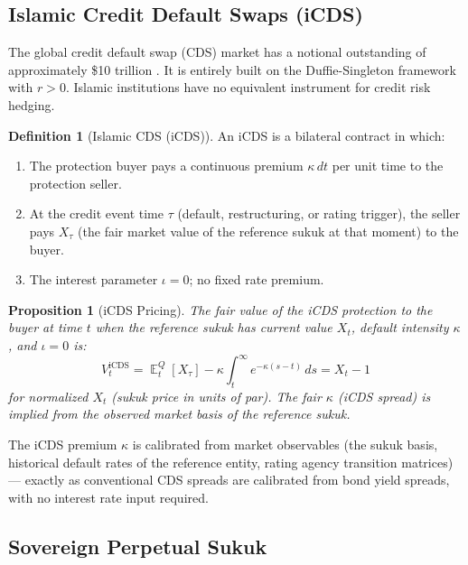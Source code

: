 \documentclass[10pt,twocolumn]{article}
\theoremstyle{plain}
\newtheorem{proposition}{Proposition}
\theoremstyle{definition}
\newtheorem{definition}{Definition}
\DeclareMathOperator{\E}{\mathbb{E}}
\begin{document}
\subsection{Islamic Credit Default Swaps (iCDS)}
\label{sec:icds}

The global credit default swap (CDS) market has a notional
outstanding of approximately \$10 trillion \cite{BIS2024}. It
is entirely built on the Duffie-Singleton framework with $r > 0$.
Islamic institutions have no equivalent instrument for credit
risk hedging.

\begin{definition}[Islamic CDS (iCDS)]
An iCDS is a bilateral contract in which:
\begin{enumerate}[leftmargin=*,noitemsep]
\item The protection buyer pays a continuous premium $\kappa\,dt$
per unit time to the protection seller.
\item At the credit event time $\tau$ (default, restructuring, or
rating trigger), the seller pays $X_\tau$ (the fair market value
of the reference sukuk at that moment) to the buyer.
\item The interest parameter $\iota = 0$; no fixed rate premium.
\end{enumerate}
\end{definition}

\begin{proposition}[iCDS Pricing]
The fair value of the iCDS protection to the buyer at time $t$
when the reference sukuk has current value $X_t$, default
intensity $\kappa$, and $\iota = 0$ is:
\begin{equation}
V_t^{\mathrm{iCDS}} = \E^Q_t[X_\tau]
- \kappa\int_t^\infty e^{-\kappa(s-t)}\,ds
= X_t - 1
\label{eq:icds}
\end{equation}
for normalized $X_t$ (sukuk price in units of par). The fair
$\kappa$ (iCDS spread) is implied from the observed market
basis of the reference sukuk.
\end{proposition}

The iCDS premium $\kappa$ is calibrated from market observables
(the sukuk basis, historical default rates of the reference
entity, rating agency transition matrices) --- exactly as
conventional CDS spreads are calibrated from bond yield spreads,
with no interest rate input required.

\subsection{Sovereign Perpetual Sukuk}
\label{sec:sovereign}
\end{document}
